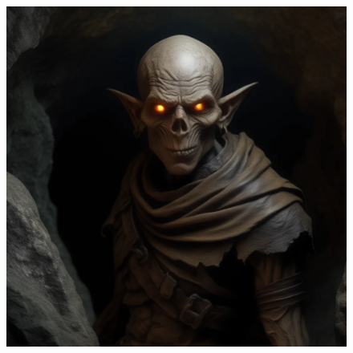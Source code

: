 \begin{figure}[h]
\begin{center}
\includegraphics[scale=0.24]{img/ai-images/ghoul.png}
\end{center}
\end{figure}
